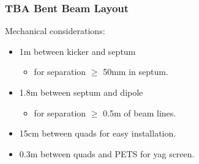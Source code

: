 \documentclass[professionalfonts,t]{beamer}
\begin{document}
\begin{frame}
\frametitle{TBA Bent Beam Layout}
\begin{tikzpicture}[scale=\textwidth/22cm, text=black]

\end{tikzpicture}

\vspace{-1em}
Mechanical considerations:
\begin{itemize}
	\item 1m between kicker and septum
	\begin{itemize}
		\item for separation $\ge$ 50mm in septum. 
	\end{itemize}
	\item 1.8m between septum and dipole
	\begin{itemize}
		\item for separation $\ge$ 0.5m of beam lines.
	\end{itemize}
	\item 15cm between quads for easy installation. 
	\item 0.3m between quads and PETS for yag screen.  
\end{itemize}
\end{frame}
\iffalse
\end{document}
